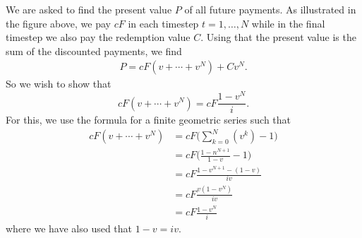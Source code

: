 \documentclass[a4paper,colorinlistoftodos, 10pt]{article}
\begin{document}
\noindent We are asked to find the present value $P$ of all future payments. As illustrated in the figure above, we pay $cF$ in each timestep $t=1,\dots,N$ while in the final timestep we also pay the redemption value $C$. Using that the present value is the sum of the discounted payments, we find 
\begin{align*}
P = cF(v + \cdots + v^N) + Cv^N.
\end{align*}
So we wish to show that 
\begin{equation*}
cF(v + \cdots + v^N) = cF\frac{1-v^N}{i}.
\end{equation*}
For this, we use the formula for a finite geometric series such that
\begin{align*}
cF(v + \cdots + v^N) & = cF\Big(\sum_{k=0}^N (v^k) - 1\Big) \\
& = cF\Big(\frac{1-n^{N+1}}{1-v} - 1\Big) \\
& = cF\frac{1-v^{N+1} - (1-v)}{iv} \\
& = cF\frac{v(1-v^N)}{iv} \\
& = cF\frac{1-v^N}{i}
\end{align*}
where we have also used that $1-v = iv$.
\end{document}
